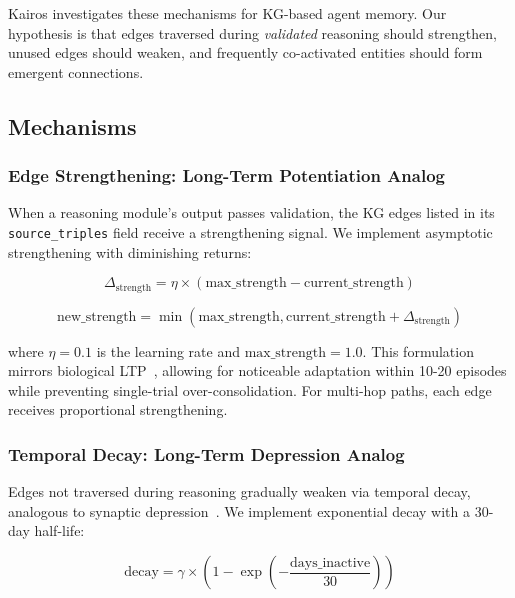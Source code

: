 \documentclass{article}
\begin{document}
Kairos investigates these mechanisms for KG-based agent memory. Our hypothesis is that edges traversed during \textit{validated} reasoning should strengthen, unused edges should weaken, and frequently co-activated entities should form emergent connections.

\subsection{Mechanisms}

\subsubsection{Edge Strengthening: Long-Term Potentiation Analog}

When a reasoning module's output passes validation, the KG edges listed in its \texttt{source\_triples} field receive a strengthening signal. We implement asymptotic strengthening with diminishing returns:

\begin{equation}
\Delta_{\text{strength}} = \eta \times (\text{max\_strength} - \text{current\_strength})
\label{eq:ltp}
\end{equation}

\begin{equation}
\text{new\_strength} = \min(\text{max\_strength}, \text{current\_strength} + \Delta_{\text{strength}})
\end{equation}

where $\eta = 0.1$ is the learning rate and $\text{max\_strength} = 1.0$. This formulation mirrors biological LTP~\citep{squire2015memory}, allowing for noticeable adaptation within 10-20 episodes while preventing single-trial over-consolidation. For multi-hop paths, each edge receives proportional strengthening.

\subsubsection{Temporal Decay: Long-Term Depression Analog}

Edges not traversed during reasoning gradually weaken via temporal decay, analogous to synaptic depression~\citep{squire2015memory}. We implement exponential decay with a 30-day half-life:

\begin{equation}
\text{decay} = \gamma \times \left(1 - \exp\left(-\frac{\text{days\_inactive}}{30}\right)\right)
\label{eq:ltd}
\end{equation}
\end{document}
